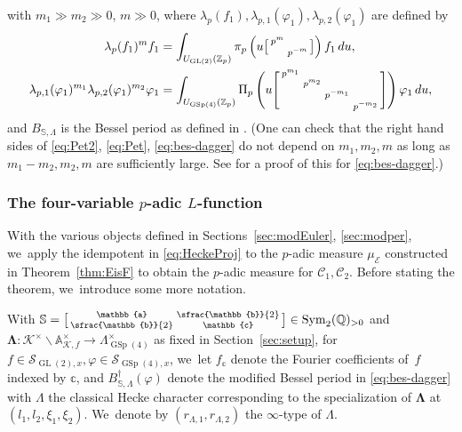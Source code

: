 \documentclass[JEP,XML,SOM,Unicode,published]{cedram}
\newenvironment{smallbmatrix}{\big[\begin{smallmatrix}}{\end{smallmatrix}\big]}
\newcommand{\Lfunction}{$L$\nobreakdash-func\-tion\xspace}
\newenvironment{bsm}
{\left[\begin{smallmatrix}}
{\end{smallmatrix}\right]}
\theoremstyle{plain}
\theoremstyle{remark}
\newcommand{\bA}{\mathbb{A}}
\newcommand{\bQ}{\mathbb{Q}}
\newcommand{\bS}{\mathbb{S}}
\newcommand{\bZ}{\mathbb{Z}}
\newcommand{\bba}{\mathbb{a}}
\newcommand{\bbb}{\mathbb{b}}
\newcommand{\bbc}{\mathbb{c}}
\newcommand{\cE}{\mathcal{E}}
\newcommand{\cK}{\mathcal{K}}
\newcommand{\sC}{\mathscr{C}}
\newcommand{\sS}{\mathscr{S}}
\DeclareMathOperator{\GL}{GL}
\DeclareMathOperator{\GSp}{GSp}
\DeclareMathOperator{\Sym}{Sym}
\let\bes B
\newcommand{\sLambda}{\scriptscriptstyle{\Lambda}}
\newcommand{\bLam}{\boldsymbol\Lambda}
\begin{document}
with $m_1\gg m_2\gg 0$, $m\gg 0$, where $\lambda_p(f_1),\lambda_{p,1}(\varphi_1),\lambda_{p,2}(\varphi_1)$ are defined by
\begin{align*}
\lambda_p(f_1)^m f_1&=\int_{U_{\GL(2)}(\bZ_p)} \pi_p\left(u\begin{smallbmatrix}p^m\\&p^{-m}\end{smallbmatrix}\right)f_1\,du,\\
\lambda_{p,1}(\varphi_1)^{m_1}\lambda_{p,2}(\varphi_1)^{m_2} \varphi_1&=\int_{U_{\GSp(4)}(\bZ_p)} \Pi_p\left(u\begin{bsm}p^{m_1}\\&p^{m_2}\\&&p^{-m_1}\\&&&p^{-m_2}\end{bsm}\right)\varphi_1\,du,
\end{align*}
and $\bes_{\bS,\Lambda}$ is the Bessel period as defined in \cite[\S2.2.1]{pFL}. (One can check that the right hand sides of \eqref{eq:Pet2}, \eqref{eq:Pet}, \eqref{eq:bes-dagger} do not depend on $m_1,m_2,m$ as long as $m_1-m_2,m_2,m$ are sufficiently large. See \cite[Prop.\,2.7.1]{pFL} for a proof of this for \eqref{eq:bes-dagger}.)

\subsubsection{The four-variable \texorpdfstring{$p$-adic \protect\Lfunction}{pL}}

With the various objects defined in Sections~\ref{sec:modEuler}, \ref{sec:modper}, we~apply the idempotent in \eqref{eq:HeckeProj} to the $p$-adic measure $\mu_\cE$ constructed in Theorem~\ref{thm:EisF} to obtain the $p$-adic measure for $\sC_1,\sC_2$. Before stating the theorem, we~introduce some more notation.

With $\bS=\begin{smallbmatrix}\bba&\sfrac{\bbb}{2}\\ \sfrac{\bbb}{2}&\bbc\end{smallbmatrix}\in\Sym_2(\bQ)_{>0}
$ and $\bLam:\cK^\times\backslash\bA^\times_{\cK,f}\to \Lambda^\times_{\GSp(4)}$ as fixed in Section~\ref{sec:setup}, for $f\in\sS_{\GL(2),x},\varphi\in\sS_{\GSp(4),x}$, we~let $f_\bbc$ denote the Fourier coefficients of~$f$ indexed by $\bbc$, and $\bes^\dagger_{\bS,\Lambda}\left(\varphi\right)$ denote the modified Bessel period in \eqref{eq:bes-dagger} with $\Lambda$ the classical Hecke character corresponding to the specialization of $\bLam$ at $(l_1,l_2,\xi_1,\xi_2)$. We~denote by $(r_{\sLambda,1},r_{\sLambda,2})$ the $\infty$-type of $\Lambda$.
\end{document}
